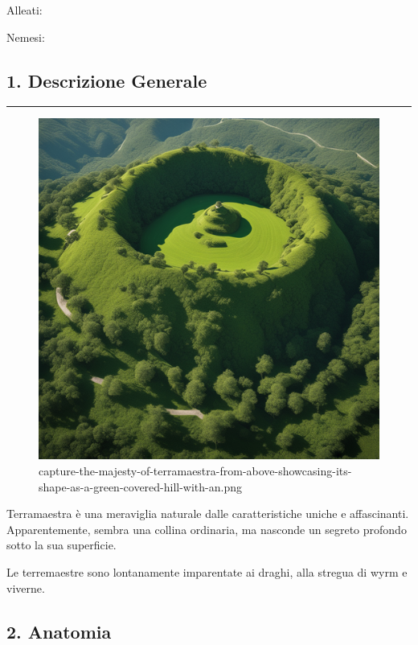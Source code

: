 Alleati:

Nemesi:

\subsection{1. Descrizione Generale}\label{descrizione-generale}

\begin{center}\rule{0.5\linewidth}{0.5pt}\end{center}

\begin{figure}
\centering
\includegraphics{capture-the-majesty-of-terramaestra-from-above-showcasing-its-shape-as-a-green-covered-hill-with-an.png}
\caption{capture-the-majesty-of-terramaestra-from-above-showcasing-its-shape-as-a-green-covered-hill-with-an.png}
\end{figure}

Terramaestra è una meraviglia naturale dalle caratteristiche uniche e
affascinanti. Apparentemente, sembra una collina ordinaria, ma nasconde
un segreto profondo sotto la sua superficie.

Le terremaestre sono lontanamente imparentate ai draghi, alla stregua di
wyrm e viverne.

\subsection{2. Anatomia}\label{anatomia}

